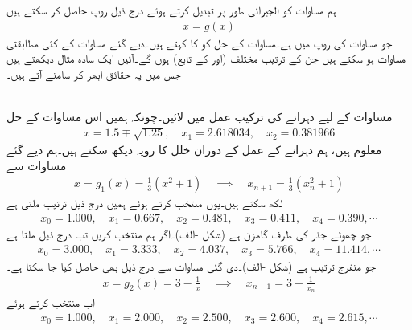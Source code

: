  ہم مساوات  کو الجبرائی طور پر تبدیل کرتے ہوئے درج ذیل روپ حاصل کر سکتے ہیں
\begin{align}\label{مساوات_اعدادی_تفاعل_پ}
x=g(x)
\end{align}
جو مساوات   کی روپ میں ہے۔مساوات  کے حل کو  کا  کہتے ہیں۔دیے گئے مساوات  کے کئی مطابقتی مساوات  ہو سکتے ہیں جن کے ترتیب  مختلف (اور  کے تابع) ہوں گے۔آئیں ایک سادہ مثال دیکھتے ہیں جس میں یہ حقائق ابھر کر سامنے آتے ہیں۔

\quad {}\\
مساوات  کے لیے دہرانے کی ترکیب عمل میں لائیں۔چونکہ ہمیں اس مساوات کے حل
\begin{align*}
x=1.5\mp\sqrt{1.25},\quad x_1=\num{2.618034},\quad x_2=\num{0.381966}
\end{align*}
معلوم ہیں، ہم دہرانے کے عمل کے دوران خلل کا رویہ دیکھ سکتے ہیں۔ہم دیے گئے مساوات سے
\begin{align}\label{مساوات_مثال_اعدادی_دہرانا_الف}
x=g_1(x)=\frac{1}{3}(x^2+1)\quad \implies \quad x_{n+1}=\frac{1}{3}(x_n^2+1)
\end{align}
لکھ سکتے ہیں۔یوں  منتخب کرتے ہوئے ہمیں درج ذیل ترتیب ملتی ہے
\begin{align*}
x_0=\num{1.000},\quad x_1=\num{0.667},\quad x_2=\num{0.481},\quad x_3=\num{0.411},\quad x_4=\num{0.390}, \cdots
\end{align*}
جو چھوٹے جذر کی طرف گامزن ہے (شکل -الف)۔اگر ہم  منتخب کریں تب درج ذیل ملتا ہے
\begin{align*}
x_0=\num{3.000},\quad x_1=\num{3.333},\quad x_2=\num{4.037},\quad x_3=\num{5,766},\quad x_4=\num{11.414}, \cdots
\end{align*}
جو منفرج ترتیب ہے (شکل -الف)۔دی گئی مساوات سے درج ذیل بھی حاصل کیا جا سکتا ہے۔
\begin{align}\label{مساوات_مثال_اعدادی_دہرانا_ب}
x=g_2(x)=3-\frac{1}{x}\quad \implies \quad x_{n+1}=3-\frac{1}{x_n}
\end{align}
اب  منتخب کرتے ہوئے
\begin{align*}
x_0=\num{1.000},\quad x_1=\num{2.000},\quad x_2=\num{2.500},\quad x_3=\num{2.600},\quad x_4=\num{2.615}, \cdots
\end{align*}
